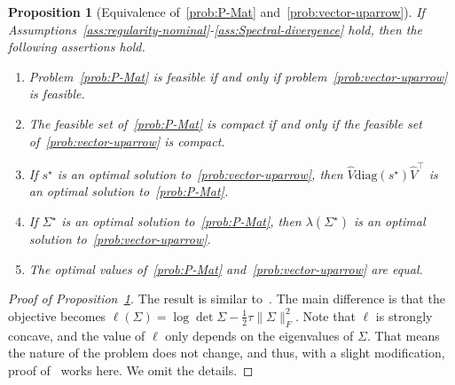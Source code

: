 \documentclass[11pt]{article}
\newtheorem{proposition}{Proposition}
\newcommand{\opt}{^\star}
\def\diag{\mathrm{diag}}
\def\transpose{\top}
\newcommand{\wh}{\widehat}
\begin{document}
\begin{proposition}[Equivalence of~\eqref{prob:P-Mat} and~\eqref{prob:vector-uparrow}]\label{prop:equivalence-Mat-Vec-upper}
    If Assumptions~\ref{ass:regularity-nominal}-\ref{ass:Spectral-divergence} hold, then the following assertions hold.
    \begin{enumerate}[label=(\roman*)]
        \item Problem~\eqref{prob:P-Mat} is feasible if and only if problem~\eqref{prob:vector-uparrow} is feasible.
        \item The feasible set of~\eqref{prob:P-Mat} is compact if and only if the feasible set of~\eqref{prob:vector-uparrow} is compact.
        \item If $s\opt$ is an optimal solution to~\eqref{prob:vector-uparrow}, then $\wh V\diag(s\opt){\wh V}^\transpose$ is an optimal solution to~\eqref{prob:P-Mat}.
        \item If $\Sigma\opt$ is an optimal solution to~\eqref{prob:P-Mat}, then $\lambda(\Sigma\opt)$ is an optimal solution to~\eqref{prob:vector-uparrow}. 
        \item The optimal values of~\eqref{prob:P-Mat} and~\eqref{prob:vector-uparrow} are equal.
    \end{enumerate}
\end{proposition}
\begin{proof}[Proof of Proposition~\ref{prop:equivalence-Mat-Vec-upper}]
    The result is similar to~\cite[Proposition 9]{ref:yue2024geometric}. The main difference is that the objective becomes $\ell(\Sigma)=\log\det \Sigma - \frac{1}{2}\tau\|\Sigma\|_F^2$. Note that $\ell$ is strongly concave, and the value of $\ell$ only depends on the eigenvalues of $\Sigma$. That means the nature of the problem does not change, and thus, with a slight modification, proof of~\cite[Proposition 9]{ref:yue2024geometric} works here. We omit the details. 
\end{proof}
\end{document}

